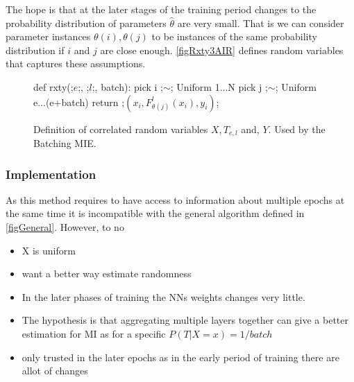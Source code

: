 \documentclass[dissertation.tex]{subfiles}
\begin{document}
The hope is that at the later stages of the training period changes to the
probability distribution of parameters $\hat\theta$ are very small. That is we
can consider parameter instances $\theta(i),\theta(j)$ to be instances of the
same probability distribution if $i$ and $j$ are close enough.
\autoref{figRxty3AIR} defines random variables that captures these assumptions.

\begin{figure}[h]
    \begin{pythonfigure}
      def rxty(;$e$;, ;$l$;, batch):
        pick i ;$\sim$; Uniform {1...N}
        pick j ;$\sim$; Uniform {e...(e+batch)}
        return ;$(x_i, F_{\theta(j)}^l(x_i), y_i)$;
    \end{pythonfigure}
    \caption{
      Definition of correlated random variables $X, T_{e,l}$ and, $Y$. Used by
      the Batching MIE.
    }
    \label{figRxty3AIR}
\end{figure}

\subsubsection{Implementation} As this method requires to have access to
information about multiple epochs at the same time it is incompatible with the
general algorithm defined in \autoref{figGeneral}. However, to no


\begin{itemize}
  \item{
      X is uniform
    }
  \item{
      want a better way estimate randomness
    }
  \item{
      In the later phases of training the NNs weights changes very little.
    }
  \item{
      The hypothesis is that aggregating multiple layers together can give a
      better estimation for MI as for a specific $P(T|X=x)=1/batch$
    }
  \item{
      only trusted in the later epochs as in the early period of training there
      are allot of changes
    }
\end{itemize}
\newpage
\end{document}
